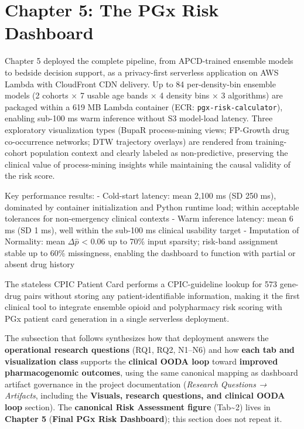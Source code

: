 \documentclass[
  12pt,
]{book}
\begin{document}
\section{Chapter 5: The PGx Risk
Dashboard}\label{chapter-5-the-pgx-risk-dashboard}

Chapter 5 deployed the complete pipeline, from APCD-trained ensemble
models to bedside decision support, as a privacy-first serverless
application on AWS Lambda with CloudFront CDN delivery. Up to 84
per-density-bin ensemble models (2 cohorts × 7 usable age bands × 4
density bins × 3 algorithms) are packaged within a 619 MB Lambda
container (ECR: \texttt{pgx-risk-calculator}), enabling sub-100 ms warm
inference without S3 model-load latency. Three exploratory visualization
types (BupaR process-mining views; FP-Growth drug co-occurrence
networks; DTW trajectory overlays) are rendered from training-cohort
population context and clearly labeled as non-predictive, preserving the
clinical value of process-mining insights while maintaining the causal
validity of the risk score.

Key performance results: - Cold-start latency: mean 2,100 ms (SD 250
ms), dominated by container initialization and Python runtime load;
within acceptable tolerances for non-emergency clinical contexts - Warm
inference latency: mean 6 ms (SD 1 ms), well within the sub-100 ms
clinical usability target - Imputation of Normality: mean
\textbar{}\(\Delta\hat{p}\)\textbar{} \textless{} 0.06 up to 70\% input
sparsity; risk-band assignment stable up to 60\% missingness, enabling
the dashboard to function with partial or absent drug history

The stateless CPIC Patient Card performs a CPIC-guideline lookup for 573
gene-drug pairs without storing any patient-identifiable information,
making it the first clinical tool to integrate ensemble opioid and
polypharmacy risk scoring with PGx patient card generation in a single
serverless deployment.

The subsection that follows synthesizes how that deployment answers the
\textbf{operational research questions} (RQ1, RQ2, N1--N6) and how
\textbf{each tab and visualization class} supports the \textbf{clinical
OODA loop} toward \textbf{improved pharmacogenomic outcomes}, using the
same canonical mapping as dashboard artifact governance in the project
documentation (\emph{Research Questions → Artifacts}, including the
\textbf{Visuals, research questions, and clinical OODA loop} section).
The \textbf{canonical Risk Assessment figure} (Tab\textasciitilde2)
lives in \textbf{Chapter 5} (\textbf{Final PGx Risk Dashboard}); this
section does not repeat it.
\end{document}
